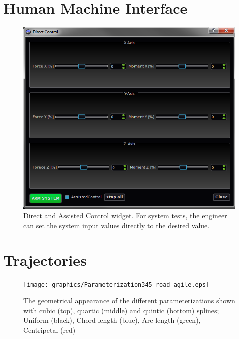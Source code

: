 
\chapter{Human Machine Interface}
\label{cha:appendix_HMI}
\begin{figure}[H]
    \includegraphics[width = \textwidth]{graphics/HMI/qgc_manual_control_widget.png}
  \caption{Direct and Assisted Control widget. For system tests, the engineer can set the system input values directly to the desired value.}
  \label{fig:parameterization_cqq}
\end{figure}

\chapter{Trajectories}
\label{cha:appendix}

\begin{figure}[H]
  \begin{minipage}[t]{0.9\textwidth}
    \texttt{[image: graphics/Parameterization345\_road\_agile.eps]}
  \end{minipage}
  \caption{The geometrical appearance of the different parameterizations shown with cubic (top), quartic (middle) and quintic (bottom) splines; Uniform (black), Chord length (blue), Arc length (green), Centripetal (red)}
  \label{fig:parameterization_cqq}
\end{figure}


